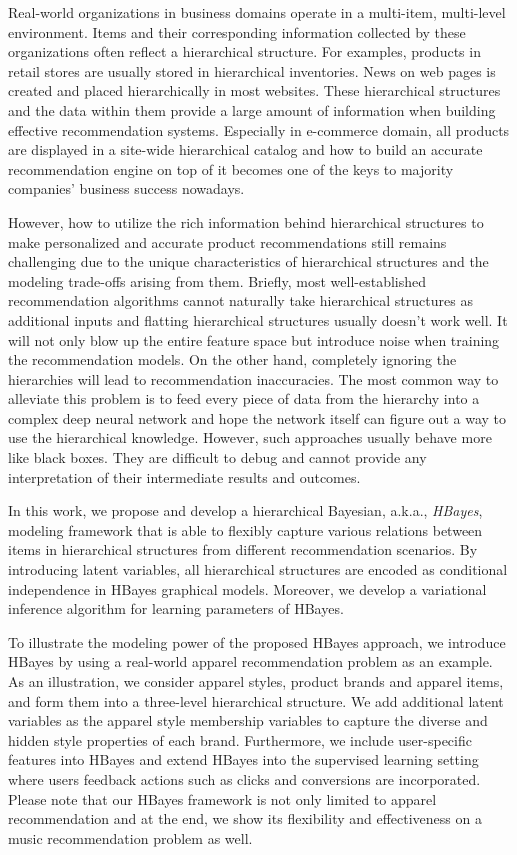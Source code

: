Real-world organizations in business domains operate in a multi-item, multi-level environment. Items and their corresponding information collected by these organizations often reflect a hierarchical structure. For examples, products in retail stores are usually stored in hierarchical inventories. News on web pages is created and placed hierarchically in most websites. These hierarchical structures and the data within them provide a large amount of information when building effective recommendation systems. Especially in e-commerce domain, all products are displayed in a site-wide hierarchical catalog and how to build an accurate recommendation engine on top of it becomes one of the keys to majority companies' business success nowadays. 

However, how to utilize the rich information behind hierarchical structures to make personalized and accurate product recommendations still remains challenging due to the unique characteristics of hierarchical structures and the modeling trade-offs arising from them. Briefly, most well-established recommendation algorithms cannot naturally take hierarchical structures as additional inputs and flatting hierarchical structures usually doesn't work well. It will not only blow up the entire feature space but introduce noise when training the recommendation models. On the other hand, completely ignoring the hierarchies will lead to recommendation inaccuracies. The most common way to alleviate this problem is to feed every piece of data from the hierarchy into a complex deep neural network and hope the network itself can figure out a way to use the hierarchical knowledge. However, such approaches usually behave more like black boxes. They are difficult to debug and cannot provide any interpretation of their intermediate results and outcomes.

In this work, we propose and develop a hierarchical Bayesian, a.k.a., \emph{HBayes}, modeling framework that is able to flexibly capture various relations between items in hierarchical structures from different recommendation scenarios. By introducing latent variables, all hierarchical structures are encoded as conditional independence in HBayes graphical models. Moreover, we develop a variational inference algorithm for learning parameters of HBayes. 

To illustrate the modeling power of the proposed HBayes approach, we introduce HBayes by using a real-world apparel recommendation problem as an example. As an illustration, we consider apparel styles, product brands and apparel items,  and form them into a three-level hierarchical structure. We add additional latent variables as the apparel style membership variables to capture the diverse and hidden style properties of each brand. Furthermore, we include user-specific features into HBayes and extend HBayes into the supervised learning setting where users feedback actions such as clicks and conversions are incorporated. Please note that our HBayes framework is not only limited to apparel recommendation and at the end, we show its flexibility and effectiveness on a music recommendation problem as well.

